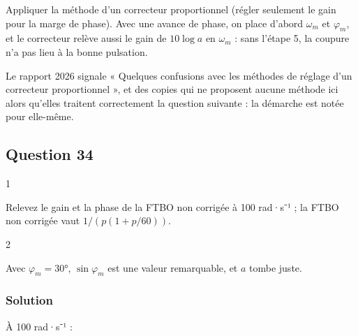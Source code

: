 \documentclass[11pt,a4paper]{article}
\newcommand{\equationajustee}[1]{%
  \sbox{\boiteequation}{$\displaystyle #1$}%
  \ifdim\wd\boiteequation>\linewidth
    \[\resizebox{\linewidth}{!}{\usebox{\boiteequation}}\]%
  \else
    \[#1\]%
  \fi}
\begin{document}
\begin{piege}

Appliquer la méthode d'un correcteur proportionnel (régler seulement le gain pour la marge de phase). Avec une avance de phase, on place d'abord \(\omega_m\) et \(\varphi_m\), et le correcteur relève aussi le gain de \(10\log a\) en \(\omega_m\) : sans l'étape 5, la coupure n'a pas lieu à la bonne pulsation.

\end{piege}

\begin{jury}

Le rapport 2026 signale « Quelques confusions avec les méthodes de réglage d'un correcteur proportionnel », et des copies qui ne proposent aucune méthode ici alors qu'elles traitent correctement la question suivante : la démarche est notée pour elle-même.

\end{jury}

\hypertarget{question-34}{%
\subsection{Question 34}\label{question-34}}

\begin{indication}{1}

Relevez le gain et la phase de la FTBO non corrigée à 100 rad·s⁻¹ ; la FTBO non corrigée vaut \(1/(p(1+p/60))\).

\end{indication}

\begin{indication}{2}

Avec \(\varphi_m = 30°\), \(\sin\varphi_m\) est une valeur remarquable, et \(a\) tombe juste.

\end{indication}

\hypertarget{solution-33}{%
\subsubsection{Solution}\label{solution-33}}

À 100 rad·s⁻¹ :

\equationajustee{\begin{aligned}
|\text{FTBO}_{nc}| &= \frac{3}{100\sqrt{34}}\\
&\approx 5{,}1\cdot10^{-3}
\end{aligned}}
\end{document}
